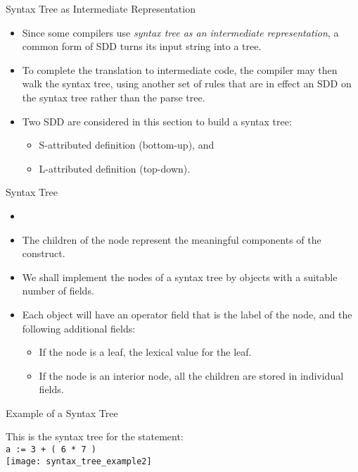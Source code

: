 \begin{bibunit}[apalike]
\tableofcontentslide[sections={1-5},sectionstyle={show/shaded},subsectionstyle={show/shaded/hide},subsubsectionstyle={show/show/hide/hide}]

\begin{frame}{Syntax Tree as Intermediate Representation}
	\begin{itemize}
	\item Since some compilers use \emph{syntax tree as an intermediate representation}, a common form of SDD turns its input string into a tree.
	\vfill
	\item To complete the translation to intermediate code, the compiler may then walk the syntax tree, using another set of rules that are in effect an SDD on the syntax tree rather than the parse tree.
	\vfill
	\item Two SDD are considered in this section to build a syntax tree:
		\begin{itemize}
		\item S-attributed definition (bottom-up), and
		\item L-attributed definition (top-down).
		\end{itemize}
	\end{itemize}
\end{frame}

\begin{frame}{Syntax Tree}
	\begin{itemize}
	\item {}
	\item The children of the node represent the meaningful components of the construct.
	\vfill
	\item We shall implement the nodes of a syntax tree by objects with a suitable number of fields.
	\vfill
	\item Each object will have an operator field that is the label of the node, and the following additional fields:
		\begin{itemize}
		\item If the node is a leaf, the lexical value for the leaf.
		\item If the node is an interior node, all the children are stored in individual fields.
		\end{itemize}
	\end{itemize}
\end{frame}

\begin{frame}{Example of a Syntax Tree}
	\begin{center}
		This is the syntax tree for the statement: \\
			\texttt{a := 3 + ( 6 * 7 )} \\[2em]
		\texttt{[image: syntax\_tree\_example2]}
	\end{center}
\end{frame}


\end{bibunit}
